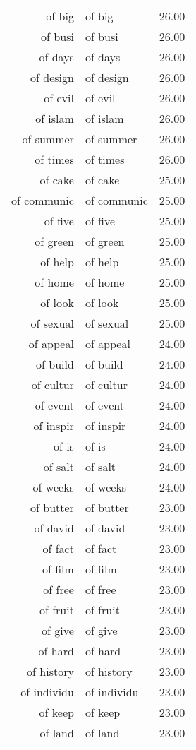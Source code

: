 \begin{table}[ht]
\begin{tabular}{rlr}
  of big & of big & 26.00 \\ 
  of busi & of busi & 26.00 \\ 
  of days & of days & 26.00 \\ 
  of design & of design & 26.00 \\ 
  of evil & of evil & 26.00 \\ 
  of islam & of islam & 26.00 \\ 
  of summer & of summer & 26.00 \\ 
  of times & of times & 26.00 \\ 
  of cake & of cake & 25.00 \\ 
  of communic & of communic & 25.00 \\ 
  of five & of five & 25.00 \\ 
  of green & of green & 25.00 \\ 
  of help & of help & 25.00 \\ 
  of home & of home & 25.00 \\ 
  of look & of look & 25.00 \\ 
  of sexual & of sexual & 25.00 \\ 
  of appeal & of appeal & 24.00 \\ 
  of build & of build & 24.00 \\ 
  of cultur & of cultur & 24.00 \\ 
  of event & of event & 24.00 \\ 
  of inspir & of inspir & 24.00 \\ 
  of is & of is & 24.00 \\ 
  of salt & of salt & 24.00 \\ 
  of weeks & of weeks & 24.00 \\ 
  of butter & of butter & 23.00 \\ 
  of david & of david & 23.00 \\ 
  of fact & of fact & 23.00 \\ 
  of film & of film & 23.00 \\ 
  of free & of free & 23.00 \\ 
  of fruit & of fruit & 23.00 \\ 
  of give & of give & 23.00 \\ 
  of hard & of hard & 23.00 \\ 
  of history & of history & 23.00 \\ 
  of individu & of individu & 23.00 \\ 
  of keep & of keep & 23.00 \\ 
  of land & of land & 23.00 \\ 

\end{tabular}
\end{table}
